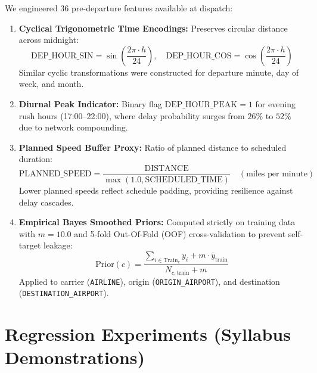 \documentclass[11pt,a4paper]{article}
\begin{document}
We engineered 36 pre-departure features available at dispatch:
\begin{enumerate}[noitemsep]
    \item \textbf{Cyclical Trigonometric Time Encodings:} Preserves circular distance across midnight:
    \begin{equation}
        \text{DEP\_HOUR\_SIN} = \sin\left(\frac{2\pi \cdot h}{24}\right), \quad \text{DEP\_HOUR\_COS} = \cos\left(\frac{2\pi \cdot h}{24}\right)
    \end{equation}
    Similar cyclic transformations were constructed for departure minute, day of week, and month.
    \item \textbf{Diurnal Peak Indicator:} Binary flag $\text{DEP\_HOUR\_PEAK} = 1$ for evening rush hours (17:00--22:00), where delay probability surges from $26\%$ to $52\%$ due to network compounding.
    \item \textbf{Planned Speed Buffer Proxy:} Ratio of planned distance to scheduled duration:
    \begin{equation}
        \text{PLANNED\_SPEED} = \frac{\text{DISTANCE}}{\max(1.0, \text{SCHEDULED\_TIME})} \quad (\text{miles per minute})
    \end{equation}
    Lower planned speeds reflect schedule padding, providing resilience against delay cascades.
    \item \textbf{Empirical Bayes Smoothed Priors:} Computed strictly on training data with $m = 10.0$ and 5-fold Out-Of-Fold (OOF) cross-validation to prevent self-target leakage:
    \begin{equation}
        \text{Prior}(c) = \frac{\sum_{i \in \text{Train}_c} y_i + m \cdot \bar{y}_{\text{train}}}{N_{c,\text{train}} + m}
    \end{equation}
    Applied to carrier (\texttt{AIRLINE}), origin (\texttt{ORIGIN\_AIRPORT}), and destination (\texttt{DESTINATION\_AIRPORT}).
\end{enumerate}

\section{Regression Experiments (Syllabus Demonstrations)}
\end{document}
